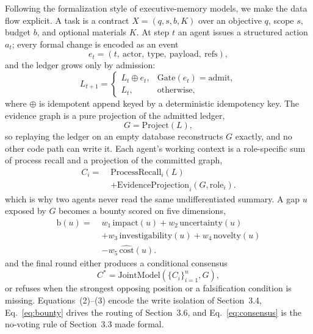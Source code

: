 Following the formalization style of executive-memory models, we make the
data flow explicit. A task is a contract $X=(q, s, b, K)$ over an objective
$q$, scope $s$, budget $b$, and optional materials $K$. At step $t$ an agent
issues a structured action $a_t$; every formal change is encoded as an event
\begin{equation}
e_t = (t,\ \mathrm{actor},\ \mathrm{type},\ \mathrm{payload},\ \mathrm{refs}),
\end{equation}
and the ledger grows only by admission:
\begin{equation}
L_{t+1} =
\begin{cases}
L_t \oplus e_t, & \mathrm{Gate}(e_t) = \mathrm{admit},\\
L_t, & \mathrm{otherwise},
\end{cases}
\end{equation}
where $\oplus$ is idempotent append keyed by a deterministic idempotency key.
The evidence graph is a pure projection of the admitted ledger,
\begin{equation}
G = \mathrm{Project}(L),
\end{equation}
so replaying the ledger on an empty database reconstructs $G$ exactly, and no
other code path can write it. Each agent's working context is a role-specific
sum of process recall and a projection of the committed graph,
\begin{equation}
\begin{aligned}
C_i =\;& \mathrm{ProcessRecall}_i(L)\\
&+ \mathrm{EvidenceProjection}_i(G, \mathrm{role}_i).
\end{aligned}
\end{equation}
which is why two agents never read the same undifferentiated summary. A gap
$u$ exposed by $G$ becomes a bounty scored on five dimensions,
\begin{equation}
\label{eq:bounty}
\begin{aligned}
\mathrm{b}(u) =\;& w_1\,\mathrm{impact}(u)
+ w_2\,\mathrm{uncertainty}(u)\\
&+ w_3\,\mathrm{investigability}(u)
+ w_4\,\mathrm{novelty}(u)\\
&- w_5\,\widehat{\mathrm{cost}}(u).
\end{aligned}
\end{equation}
and the final round either produces a conditional consensus
\begin{equation}
C^{*} = \mathrm{JointModel}(\{C_i\}_{i=1}^{n}, G),
\label{eq:consensus}
\end{equation}
or refuses when the strongest opposing position or a falsification condition
is missing. Equations~(2)--(3) encode the write isolation of
Section~3.4, Eq.~\eqref{eq:bounty} drives the routing of Section~3.6, and
Eq.~\eqref{eq:consensus} is the no-voting rule of Section~3.3 made formal.

